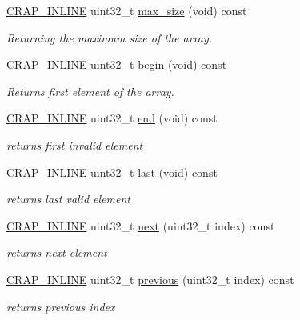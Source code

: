 \begin{DoxyCompactItemize}
\hyperlink{config__x86_8h_a5a40526b8d842e7ff731509998bb0f1c}{C\+R\+A\+P\+\_\+\+I\+N\+L\+I\+N\+E} uint32\+\_\+t \hyperlink{classcrap_1_1array_aec075c6b3b9af3688ef85bed2f19ef53}{max\+\_\+size} (void) const 
\begin{DoxyCompactList}\small\item\em Returning the maximum size of the array. \end{DoxyCompactList}\item 
\hyperlink{config__x86_8h_a5a40526b8d842e7ff731509998bb0f1c}{C\+R\+A\+P\+\_\+\+I\+N\+L\+I\+N\+E} uint32\+\_\+t \hyperlink{classcrap_1_1array_ace36c4f532353d4a2baeb4a9d320292f}{begin} (void) const 
\begin{DoxyCompactList}\small\item\em Returns first element of the array. \end{DoxyCompactList}\item 
\hyperlink{config__x86_8h_a5a40526b8d842e7ff731509998bb0f1c}{C\+R\+A\+P\+\_\+\+I\+N\+L\+I\+N\+E} uint32\+\_\+t \hyperlink{classcrap_1_1array_a958e65d5872318278a89cab82c7f4b86}{end} (void) const 
\begin{DoxyCompactList}\small\item\em returns first invalid element \end{DoxyCompactList}\item 
\hyperlink{config__x86_8h_a5a40526b8d842e7ff731509998bb0f1c}{C\+R\+A\+P\+\_\+\+I\+N\+L\+I\+N\+E} uint32\+\_\+t \hyperlink{classcrap_1_1array_a3649c6c466e2feb3c96c09bdd506c385}{last} (void) const 
\begin{DoxyCompactList}\small\item\em returns last valid element \end{DoxyCompactList}\item 
\hyperlink{config__x86_8h_a5a40526b8d842e7ff731509998bb0f1c}{C\+R\+A\+P\+\_\+\+I\+N\+L\+I\+N\+E} uint32\+\_\+t \hyperlink{classcrap_1_1array_af03ac2b000e5489ce94e47a6f277262d}{next} (uint32\+\_\+t index) const 
\begin{DoxyCompactList}\small\item\em returns next element \end{DoxyCompactList}\item 
\hyperlink{config__x86_8h_a5a40526b8d842e7ff731509998bb0f1c}{C\+R\+A\+P\+\_\+\+I\+N\+L\+I\+N\+E} uint32\+\_\+t \hyperlink{classcrap_1_1array_a7d0440760afe9704c78d950e9e38bfd9}{previous} (uint32\+\_\+t index) const 
\begin{DoxyCompactList}\small\item\em returns previous index \end{DoxyCompactList}\item 

\end{DoxyCompactItemize}
